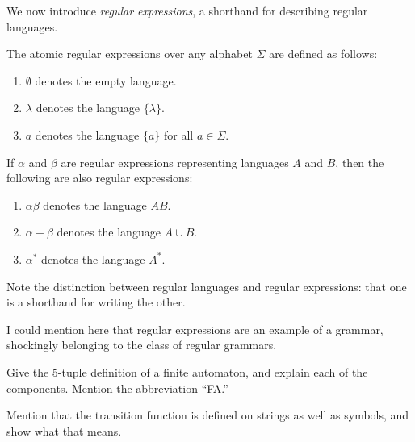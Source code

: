\documentclass{bcthesis}
\renewcommand{\meo}{}
\begin{document}
	We now introduce \textit{regular expressions}, a shorthand for describing regular languages.

	\begin{definition}
		The atomic regular expressions over any alphabet $\Sigma$ are defined as follows:
		\begin{enumerate}[label=(\roman*), itemsep = -0.3 ex]
			\item $\emptyset$ denotes the empty language.
			\item $\lambda$ denotes the language $\{ \lambda \}$.
			\item $a$ denotes the language $\{ a \}$ for all $a \in \Sigma$.
		\end{enumerate}

		If $\alpha$ and $\beta$ are regular expressions representing languages $A$ and $B$, then the following are also regular expressions:
		\begin{enumerate}[label=(\roman*), itemsep = -0.3 ex]
			\item $\alpha \beta$ denotes the language $AB$.
			\item $\alpha + \beta$ denotes the language $A \cup B$.
			\item $\alpha^*$ denotes the language $A^*$.
		\end{enumerate}
	\end{definition}

	\begin{remark}
		Note the distinction between regular languages and regular expressions: that one is a shorthand for writing the other.
	\end{remark}

	\meo{
		I could mention here that regular expressions are an example of a grammar, shockingly belonging to the class of regular grammars.
	}


\label{ch:finite_automata}


	\begin{definition}
		Give the 5-tuple definition of a finite automaton, and explain each of the components.
		Mention the abbreviation ``FA.''
	\end{definition}

	\begin{remark}
		Mention that the transition function is defined on strings as well as symbols, and show what that means.
	\end{remark}
\end{document}
